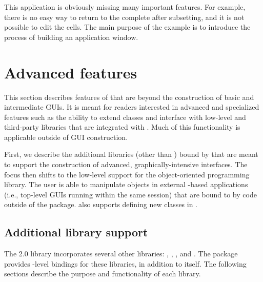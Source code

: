 \documentclass[article,shortnames]{jss}
\begin{document}
This application is obviously missing many important features. For
example, there is no easy way to return to the complete
 after subsetting, and
it is not possible to edit the cells. The main purpose of the example
is to introduce the process of building an application window.

\section{Advanced features}

This section describes features of  that are beyond the
construction of basic and intermediate GUIs. It is meant for readers
interested in advanced and specialized  features such as
the ability to extend  classes and interface with low-level
and third-party libraries that are integrated with . Much of
this functionality is applicable outside of GUI construction.


First, we describe the additional libraries (other than )
bound by
 that are meant to support the construction of advanced,
graphically-intensive interfaces. The focus then shifts to the
low-level support for the  object-oriented programming
library. The  user is able to manipulate objects in
external -based applications (i.e., top-level GUIs running
within the same  session) that are bound to 
by code
outside of the  package.  also supports defining
new  classes in .

\subsection{Additional library support}

The  2.0 library incorporates several other libraries:
, , ,  and . 
The  package provides -level bindings for
these libraries, in addition to  itself. The following
sections describe the purpose and functionality of each library.

\subsubsection[Cairo]{} 
\end{document}
